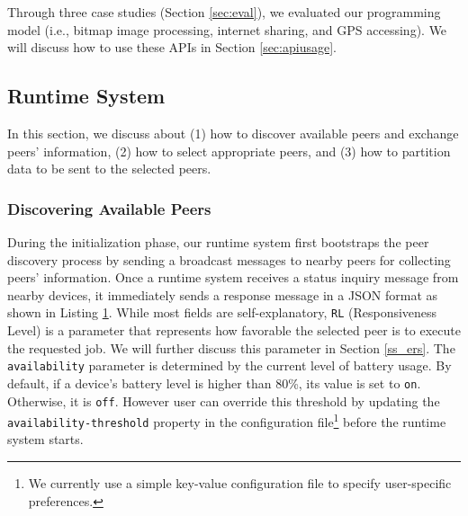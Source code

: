\documentclass{sig-alternate}
\begin{document}
Through three case studies (Section \ref{sec:eval}), we evaluated our programming model (i.e., bitmap image processing, internet sharing, and GPS accessing). We will discuss how to use these APIs in Section \ref{sec:apiusage}.


\subsection{Runtime System} \label{scheduling}
In this section, we discuss about (1) how to discover available peers and exchange peers' information, (2) how to select appropriate peers, and (3) how to partition data to be sent to the selected peers. 

\subsubsection{Discovering Available Peers}\label{ss_dfp}
During the initialization phase, our runtime system first bootstraps the peer discovery process by sending a broadcast messages to nearby peers for collecting peers' information. Once a runtime system receives a status inquiry message from nearby devices, it immediately sends a response message in a JSON format as shown in Listing \ref{code:jsonResponse}. While most fields are self-explanatory, \texttt{RL} (Responsiveness Level) is a parameter that represents how favorable the selected peer is to execute the requested job. We will further discuss this parameter in Section \ref{ss_ers}. The \texttt{availability} parameter is determined by the current level of battery usage. By default, if a device's battery level is higher than 80\%, its value is set to \texttt{on}. Otherwise, it is \texttt{off}. However user can override this threshold by updating the \texttt{availability-threshold} property in the configuration file\footnote{We currently use a simple key-value configuration file to specify user-specific preferences.} before the runtime system starts. 

\begin{figure} [!tbh]
\noindent {}	
\label{code:jsonResponse}
\end{figure}
\end{document}
